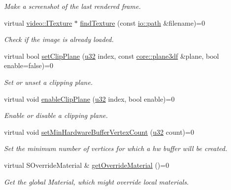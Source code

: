 \begin{DoxyCompactItemize}
\begin{DoxyCompactList}\small\item\em Make a screenshot of the last rendered frame. \end{DoxyCompactList}\item 
virtual \hyperlink{classirr_1_1video_1_1ITexture}{video\+::\+I\+Texture} $\ast$ \hyperlink{classirr_1_1video_1_1IVideoDriver_ad4eaed6d56b092e6805400ca59795de9}{find\+Texture} (const \hyperlink{namespaceirr_1_1io_ab1bdc45edb3f94d8319c02bc0f840ee1}{io\+::path} \&filename)=0
\begin{DoxyCompactList}\small\item\em Check if the image is already loaded. \end{DoxyCompactList}\item 
virtual bool \hyperlink{classirr_1_1video_1_1IVideoDriver_a959ac385891941e7ec8d99b2f105b265}{set\+Clip\+Plane} (\hyperlink{namespaceirr_a0416a53257075833e7002efd0a18e804}{u32} index, const \hyperlink{namespaceirr_1_1core_ae7491b7985dcb74b840bfcd9c054b232}{core\+::plane3df} \&plane, bool enable=false)=0
\begin{DoxyCompactList}\small\item\em Set or unset a clipping plane. \end{DoxyCompactList}\item 
virtual void \hyperlink{classirr_1_1video_1_1IVideoDriver_aaaf9567c759f866311c76e3874822339}{enable\+Clip\+Plane} (\hyperlink{namespaceirr_a0416a53257075833e7002efd0a18e804}{u32} index, bool enable)=0
\begin{DoxyCompactList}\small\item\em Enable or disable a clipping plane. \end{DoxyCompactList}\item 
virtual void \hyperlink{classirr_1_1video_1_1IVideoDriver_a79cbd1329b4206503e9a9593592502ea}{set\+Min\+Hardware\+Buffer\+Vertex\+Count} (\hyperlink{namespaceirr_a0416a53257075833e7002efd0a18e804}{u32} count)=0
\begin{DoxyCompactList}\small\item\em Set the minimum number of vertices for which a hw buffer will be created. \end{DoxyCompactList}\item 
virtual S\+Override\+Material \& \hyperlink{classirr_1_1video_1_1IVideoDriver_af119ebfd02f99f77a463007277abf14a}{get\+Override\+Material} ()=0
\begin{DoxyCompactList}\small\item\em Get the global Material, which might override local materials. \end{DoxyCompactList}\item 

\end{DoxyCompactItemize}
